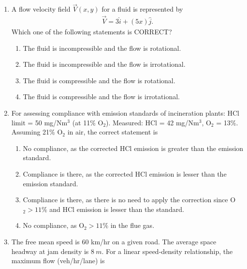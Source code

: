 \documentclass[journal]{IEEEtran}
\begin{document}
\begin{enumerate}
\item A flow velocity field $\vec{V}(x,y)$ for a fluid is represented by  
\begin{align}
\vec{V} = 3\hat{i} + (5x)\hat{j}.
\end{align}
Which one of the following statements is CORRECT?  
\hfill {}  
\begin{enumerate}
\item The fluid is incompressible and the flow is rotational.  
\item The fluid is incompressible and the flow is irrotational.  
\item The fluid is compressible and the flow is rotational.  
\item The fluid is compressible and the flow is irrotational.  
\end{enumerate}

\item For assessing compliance with emission standards of incineration plants: HCl limit = 50 mg/Nm$^3$ (at 11\% O$_2$). Measured: HCl = 42 mg/Nm$^3$, O$_2$ = 13\%. Assuming 21\% O$_2$ in air, the correct statement is  
\hfill {}  
\begin{enumerate}
\item No compliance, as the corrected HCl emission is greater than the emission standard.  
\item Compliance is there, as the corrected HCl emission is lesser than the emission standard.  
\item Compliance is there, as there is no need to apply the correction since O$_2 > 11\%$ and HCl emission is lesser than the standard.  
\item No compliance, as O$_2 > 11\%$ in the flue gas.  
\end{enumerate}

\item The free mean speed is $60$ km/hr on a given road. The average space headway at jam density is $8 \ m$. For a linear speed-density relationship, the maximum flow (veh/hr/lane) is  
\hfill {}  
\begin{enumerate}
\end{enumerate}


\end{enumerate}
\end{document}
